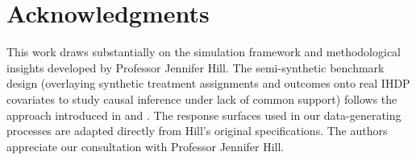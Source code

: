 \documentclass[12pt]{article}
\begin{document}
\section*{Acknowledgments}

This work draws substantially on the simulation framework and methodological insights developed by Professor Jennifer Hill. The semi-synthetic benchmark design (overlaying synthetic treatment assignments and outcomes onto real IHDP covariates to study causal inference under lack of common support) follows the approach introduced in \citet{Hill2011} and \citet{Hill2012}. The response surfaces used in our data-generating processes are adapted directly from Hill's original specifications. The authors appreciate our consultation with Professor Jennifer Hill.
\end{document}
